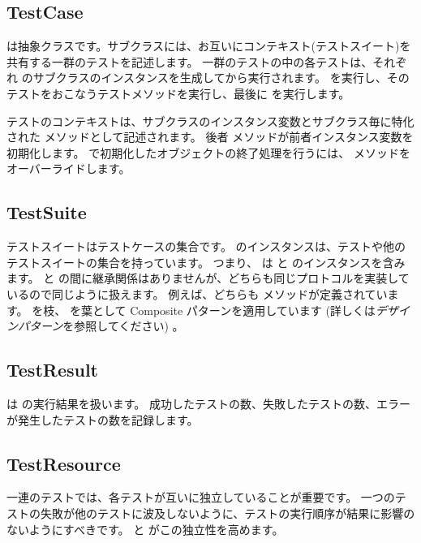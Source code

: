 \documentclass[a4paper,10pt,twoside]{book}
\begin{document}
\subsection{TestCase}

 は抽象クラスです。サブクラスには、お互いにコンテキスト(テストスイート)を共有する一群のテストを記述します。
一群のテストの中の各テストは、それぞれ  のサブクラスのインスタンスを生成してから実行されます。  を実行し、そのテストをおこなうテストメソッドを実行し、最後に  を実行します。

テストのコンテキストは、サブクラスのインスタンス変数とサブクラス毎に特化された  メソッドとして記述されます。 後者 メソッドが前者インスタンス変数を初期化します。  で初期化したオブジェクトの終了処理を行うには、  メソッドをオーバーライドします。

\subsection{TestSuite}

テストスイートはテストケースの集合です。
 のインスタンスは、テストや他のテストスイートの集合を持っています。
つまり、  は  と  のインスタンスを含みます。
 と  の間に継承関係はありませんが、どちらも同じプロトコルを実装しているので同じように扱えます。
例えば、どちらも  メソッドが定義されています。
 を枝、  を葉として Composite パターンを適用しています (詳しくは\textit{デザインパターン}を参照してください) 。

\subsection{TestResult}

 は  の実行結果を扱います。
成功したテストの数、失敗したテストの数、エラーが発生したテストの数を記録します。

\subsection{TestResource}

一連のテストでは、各テストが互いに独立していることが重要です。
一つのテストの失敗が他のテストに波及しないように、テストの実行順序が結果に影響のないようにすべきです。
 と  がこの独立性を高めます。
\end{document}
